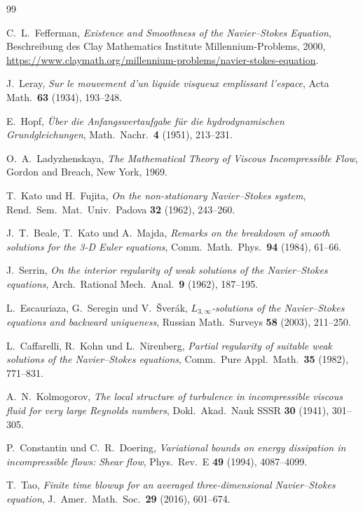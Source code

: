 \documentclass[12pt,a4paper]{article}
\theoremstyle{remark}
\begin{document}
\begin{thebibliography}{99}

C.~L.~Fefferman,
\textit{Existence and Smoothness of the Navier--Stokes Equation},
Beschreibung des Clay Mathematics Institute Millennium-Problems, 2000,
\url{https://www.claymath.org/millennium-problems/navier-stokes-equation}.

J.~Leray,
\textit{Sur le mouvement d'un liquide visqueux emplissant l'espace},
Acta Math.\ \textbf{63} (1934), 193--248.

E.~Hopf,
\textit{Über die Anfangswertaufgabe für die hydrodynamischen Grundgleichungen},
Math.\ Nachr.\ \textbf{4} (1951), 213--231.

O.~A.~Ladyzhenskaya,
\textit{The Mathematical Theory of Viscous Incompressible Flow},
Gordon and Breach, New York, 1969.

T.~Kato und H.~Fujita,
\textit{On the non-stationary Navier--Stokes system},
Rend.\ Sem.\ Mat.\ Univ.\ Padova \textbf{32} (1962), 243--260.

J.~T.~Beale, T.~Kato und A.~Majda,
\textit{Remarks on the breakdown of smooth solutions for the 3-D Euler equations},
Comm.\ Math.\ Phys.\ \textbf{94} (1984), 61--66.

J.~Serrin,
\textit{On the interior regularity of weak solutions of the Navier--Stokes equations},
Arch.\ Rational Mech.\ Anal.\ \textbf{9} (1962), 187--195.

L.~Escauriaza, G.~Seregin und V.~Šverák,
\textit{$L_{3,\infty}$-solutions of the Navier--Stokes equations and backward uniqueness},
Russian Math.\ Surveys \textbf{58} (2003), 211--250.

L.~Caffarelli, R.~Kohn und L.~Nirenberg,
\textit{Partial regularity of suitable weak solutions of the Navier--Stokes equations},
Comm.\ Pure Appl.\ Math.\ \textbf{35} (1982), 771--831.

A.~N.~Kolmogorov,
\textit{The local structure of turbulence in incompressible viscous fluid for very large Reynolds numbers},
Dokl.\ Akad.\ Nauk SSSR \textbf{30} (1941), 301--305.

P.~Constantin und C.~R.~Doering,
\textit{Variational bounds on energy dissipation in incompressible flows: Shear flow},
Phys.\ Rev.\ E \textbf{49} (1994), 4087--4099.

T.~Tao,
\textit{Finite time blowup for an averaged three-dimensional Navier--Stokes equation},
J.\ Amer.\ Math.\ Soc.\ \textbf{29} (2016), 601--674.


\end{thebibliography}
\end{document}
